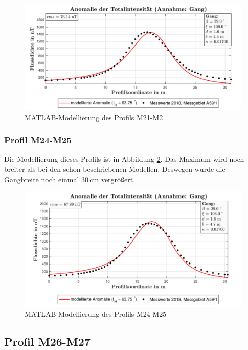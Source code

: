 \begin{figure}
 \centering
 \includegraphics[width=\textwidth]{fig/modM21}
 \caption{MATLAB-Modellierung des Profils M21-M2}
 \label{fig:modM21}
\end{figure}

\subsubsection{Profil M24-M25}

Die Modellierung dieses Profils ist in Abbildung \ref{fig:modM24}. Das Maximum wird noch breiter als bei den schon beschriebenen Modellen. Deswegen wurde die Gangbreite noch einmal 30\,cm vergrößert. 

\begin{figure}
 \centering
 \includegraphics[width=\textwidth]{fig/modM24}
 \caption{MATLAB-Modellierung des Profils M24-M25}
 \label{fig:modM24}
\end{figure}


\subsection{Profil M26-M27}


